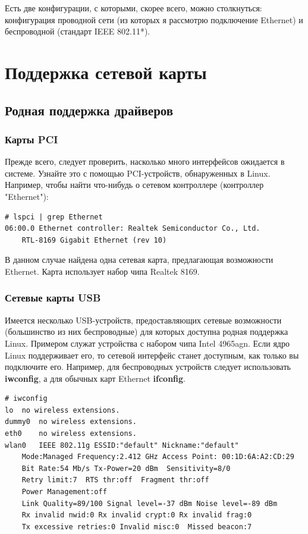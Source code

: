 \documentclass[10pt]{book}
\begin{document}
Есть две конфигурации, с которыми, скорее всего, можно столкнуться: конфигурация проводной сети (из которых я рассмотрю подключение Ethernet) и беспроводной (стандарт IEEE 802.11*).
\section{Поддержка сетевой карты}
\subsection{Родная поддержка драйверов}
\subsubsection{Карты PCI}
Прежде всего, следует проверить, насколько много интерфейсов ожидается в системе. Узнайте это с помощью PCI-устройств, обнаруженных в Linux. Например, чтобы найти что-нибудь о сетевом контроллере (контроллер "Ethernet"):

\begin{tcolorbox}
\begin{lstlisting}
# lspci | grep Ethernet
06:00.0 Ethernet controller: Realtek Semiconductor Co., Ltd.
	RTL-8169 Gigabit Ethernet (rev 10)
\end{lstlisting}
\end{tcolorbox}

В данном случае найдена одна сетевая карта, предлагающая возможности Ethernet. Карта использует набор чипа Realtek 8169.

\subsubsection{Сетевые карты USB}
Имеется несколько USB-устройств, предоставляющих сетевые возможности (большинство из них беспроводные) для которых доступна родная поддержка Linux. Примером служат устройства с набором чипа Intel 4965agn. Если ядро Linux поддерживает его, то  сетевой интерфейс станет доступным, как только вы подключите его. Например, для беспроводных устройств следует использовать \textbf{iwconfig}, а для обычных карт Ethernet \textbf{ifconfig}.

\begin{tcolorbox}
\begin{lstlisting}
# iwconfig
lo 	no wireless extensions.
dummy0 	no wireless extensions.
eth0 	no wireless extensions.
wlan0 	IEEE 802.11g ESSID:"default" Nickname:"default"
	Mode:Managed Frequency:2.412 GHz Access Point: 00:1D:6A:A2:CD:29
	Bit Rate:54 Mb/s Tx-Power=20 dBm  Sensitivity=8/0
	Retry limit:7  RTS thr:off  Fragment thr:off
	Power Management:off
	Link Quality=89/100 Signal level=-37 dBm Noise level=-89 dBm
	Rx invalid nwid:0 Rx invalid crypt:0 Rx invalid frag:0
	Tx excessive retries:0 Invalid misc:0  Missed beacon:7
\end{lstlisting}
\end{tcolorbox}
\end{document}
